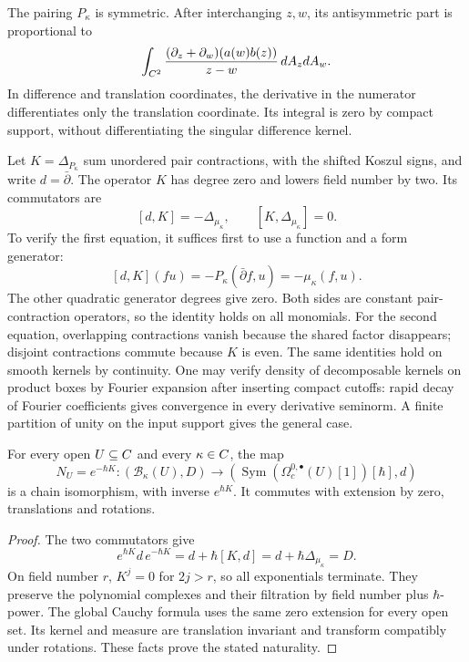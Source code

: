 The pairing $P_\kappa$ is symmetric.  After interchanging $z,w$, its
antisymmetric part is proportional to
\[
 \int_{C^2}
 \frac{(\partial_z+\partial_w)(a(w)b(z))}{z-w}\,dA_zdA_w.
\]
In difference and translation coordinates, the derivative in the
numerator differentiates only the translation coordinate.  Its
integral is zero by compact support, without differentiating the
singular difference kernel.

Let $K=\Delta_{P_\kappa}$ sum unordered pair contractions, with the
shifted Koszul signs, and write $d=\bar\partial$.  The operator $K$
has degree zero and lowers field number by two.  Its commutators are
\[
 [d,K]=-\Delta_{\mu_\kappa},\qquad
 [K,\Delta_{\mu_\kappa}]=0.
\]
To verify the first equation, it suffices first to use a function
and a form generator:
\[
 [d,K](fu)=-P_\kappa(\bar\partial f,u)
                       =-\mu_\kappa(f,u).
\]
The other quadratic generator degrees give zero.  Both sides are
constant pair-contraction operators, so the identity holds on all
monomials.  For the second equation, overlapping contractions vanish
because the shared factor disappears; disjoint contractions commute
because $K$ is even.  The same identities hold on smooth kernels by
continuity.  One may verify density of decomposable kernels on product
boxes by Fourier expansion after inserting compact cutoffs: rapid
decay of Fourier coefficients gives convergence in every derivative
seminorm.  A finite partition of unity on the input support gives
the general case.

\begin{proposition}
\label{prop:bf-cauchy-conjugation}
For every open $U\subseteq C$ and every $\kappa\in C$, the map
\[
 N_U=e^{-\hbar K}:
 (\mathcal B_\kappa(U),D)
       \longrightarrow
 (\operatorname{Sym}(\Omega_c^{0,\bullet}(U)[1])[\hbar],d)
\]
is a chain isomorphism, with inverse $e^{\hbar K}$.  It commutes
with extension by zero, translations and rotations.
\end{proposition}
\begin{proof}
The two commutators give
\[
 e^{\hbar K}d\,e^{-\hbar K}
   =d+\hbar[K,d]=d+\hbar\Delta_{\mu_\kappa}=D.
\]
On field number $r$, $K^j=0$ for $2j>r$, so all exponentials terminate.
They preserve the polynomial complexes and their filtration by
field number plus $\hbar$-power.  The global Cauchy formula uses the
same zero extension for every open set.  Its kernel and measure are
translation invariant and transform compatibly under rotations.
These facts prove the stated naturality.
\end{proof}

